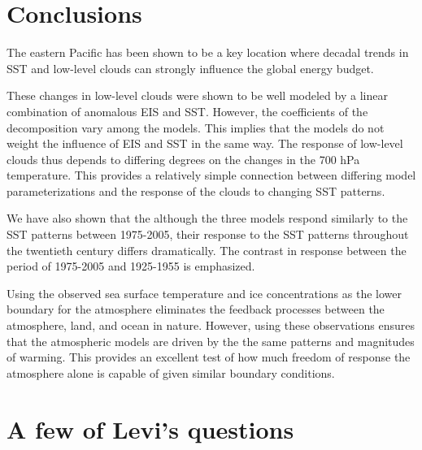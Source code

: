 \documentclass[grl]{agutex2015}
\begin{document}
\begin{article}

\section{Conclusions}

The eastern Pacific has been shown to be a key location where decadal trends in SST and low-level clouds can strongly influence the global energy budget.  

These changes in low-level clouds were shown to be well modeled by a linear combination of anomalous EIS and SST.  However, the coefficients of the decomposition vary among the models.  This implies that the models do not weight the influence of EIS and SST in the same way.  The response of low-level clouds thus depends to differing degrees on the changes in the 700 hPa temperature.  This provides a relatively simple connection between differing model parameterizations and the response of the clouds to changing SST patterns.  

We have also shown that the although the three models respond similarly to the SST patterns between 1975-2005, their response to the SST patterns throughout the twentieth century differs dramatically.  The contrast in response between the period of 1975-2005 and 1925-1955 is emphasized.  

Using the observed sea surface temperature and ice concentrations as the lower boundary for the atmosphere eliminates the feedback processes between the atmosphere, land, and ocean in nature.  However, using these observations ensures that the atmospheric models are driven by the the same patterns and magnitudes of warming.  This provides an excellent test of how much freedom of response the atmosphere alone is capable of given similar boundary conditions.  


%
%
\appendix
%
\section{A few of Levi's questions}
\begin{enumerate}


\end{enumerate}
\end{article}
\end{document}
